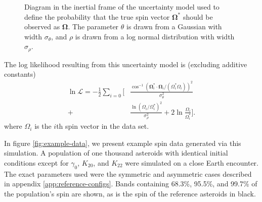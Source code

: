 \documentclass[fleqn,usenatbib]{mnras}
\newcommand{\unit}[1]{\bm{\hat{#1}}}
\newcommand{\parens}[1]{\left( #1 \right)}
\begin{document}
\begin{figure}
  \centering
  \caption{Diagram in the inertial frame of the uncertainty model used to define the probability that the true spin vector $\bm \Omega^*$ should be observed as $\bm \Omega$. The parameter $\theta$ is drawn from a Gaussian with width $\sigma_\theta$, and $\rho$ is drawn from a log normal distribution with width $\sigma_\rho$.}
  \label{fig:uncertainty-model}
\end{figure}

The log likelihood resulting from this uncertainty model is (excluding additive constants)
\begin{equation}
  \begin{split}
  \ln \mathcal{L} = -\frac{1}{2}\sum_{i = 0}\Bigg[&\frac{\cos^{-1} (\bm \Omega_i^* \cdot \bm \Omega_i/(\Omega_i^* \Omega_i))^2}{\sigma_\theta^2}\\
  +&\frac{\ln \parens{\Omega_i /\Omega_i^*}^2}{\sigma_\rho^2} + 2\ln\frac{\Omega_i}{\Omega_i^*}\Bigg].
  \end{split}
  \label{eqn:log-likelihood}
\end{equation}
where $\Omega_i$ is the $i$th spin vector in the data set.

In figure \ref{fig:example-data}, we present example spin data generated via this simulation. A population of one thousand asteroids with identical initial conditions except for $\gamma_0$, $K_{20}$, and $K_{22}$ were simulated on a close Earth encounter. The exact parameters used were the symmetric and asymmetric cases described in appendix \ref{app:reference-configs}. Bands containing 68.3\%, 95.5\%, and 99.7\% of the population's spin are shown, as is the spin of the reference asteroids in black.
\end{document}
